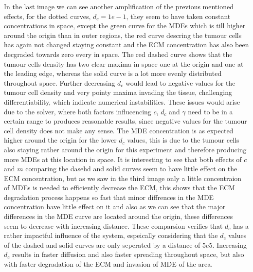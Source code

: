 In the last image we can see another amplification of the previous mentioned effects, for the dotted curves, $d_c=1e-1$, they seem to have taken constant concentrations in space, except the green curve for the MDEs which is till higher around the origin than in outer regions, the red curve descring the tumour cells has again not changed staying constant and the ECM concentration has also been decgraded towards zero every in space. The red dashed curve shows that the tumour cells density has two clear maxima in space one at the origin and one at the leading edge, whereas the solid curve is a lot more evenly distributed throughout space. Further decreasing $d_c$ would lead to negative values for the tumour cell density and very pointy maxima invading the tissue, challenging differentiability, which indicate numerical instabilities. These issues would arise due to the solver, where both factors influcencing $c$, $d_c$ and $\gamma$ need to be in a certain range to produces reasonable results, since negative values for the tumour cell density does not make any sense. The MDE concentration is as expected higher around the origin for the lower $d_c$ values, this is due to the tumour cells also staying rather around the origin for this experiment and therefore producing more MDEs at this location in space. It is interesting to see that both effects of $c$ and $m$ comparing the dasehd and solid curves seem to have little effect on the ECM concentration, but as we saw in the third image only a little concentraion of MDEs is needed to efficiently decrease the ECM, this shows that the ECM degradation process happens so fast that minor diffrences in the MDE concentration have little effect on it and also as we can see that the major differences in the MDE curve are located around the origin, these differences seem to decrease with increasing distance.
These comparsion verifies that $d_c$ has a rather impactful influence of the system, espeically considering that the $d_c$ values of the dashed and solid curves are only seperated by a distance of $5e5$. Increasing $d_c$ results in faster diffusion and also faster spreading throughout space, but also with faster degradation of the ECM and invasion of MDE of the area.

